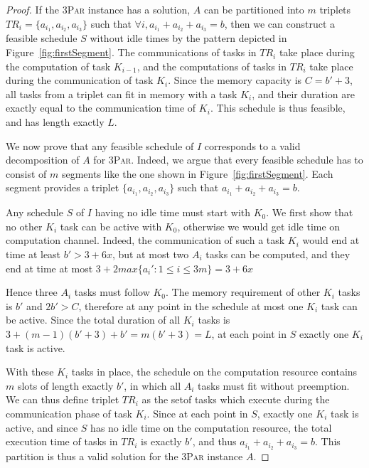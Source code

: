 \documentclass[sigconf]{acmart}
\newcommand{\threepart}{\textsc{3Par}\xspace}
\begin{document}
\begin{proof}
		
		If the \threepart instance has a solution, $A$ can be partitioned into
		$m$ triplets $TR_i = \{a_{i_1}, a_{i_2}, a_{i_3}\}$ such that $\forall
		i, a_{i_1} + a_{i_2} + a_{i_3} = b$, then we can construct a feasible
		schedule $S$ without idle times by the pattern depicted in
		Figure~\ref{fig:firstSegment}. The communications of tasks in $TR_i$ take
		place during the computation of task $K_{i-1}$, and the computations
		of tasks in $TR_i$ take place during the communication of task
		$K_i$. Since the memory capacity is $C=b'+3$, all tasks from a triplet
		can fit in memory with a task $K_i$, and their duration are exactly
		equal to the communication time of $K_i$. This schedule is thus
		feasible, and has length exactly $L$.
		
		\medskip
		
		We now prove that any feasible schedule of $I$ corresponds to a valid
		decomposition of $A$ for \threepart. Indeed, we argue that every
		feasible schedule has to consist of $m$ segments like the one shown in
		Figure~\ref{fig:firstSegment}. Each segment provides a triplet
		$\{a_{i_1}, a_{i_2}, a_{i_3}\}$ such that $a_{i_1} + a_{i_2} + a_{i_3}
		= b$.
		
		Any schedule $S$ of $I$ having no idle time must start with $K_0$. We
		first show that no other $K_i$ task can be active with $K_0$,
		otherwise we would get idle time on computation channel. Indeed, the
		communication of such a task $K_i$ would end at time at least $b'>3 +
		6x$, but at most two $A_i$ tasks can be computed, and they end at time
		at most $3+2max\{a_i':1\le i\le 3m\} = 3 + 6x$
		
		Hence three $A_i$ tasks must follow $K_0$. The memory requirement of
		other $K_i$ tasks is $b'$ and $2b'>C$, therefore at any point in the
		schedule at most one $K_i$ task can be active. Since the total
		duration of all $K_i$ tasks is $3 + (m-1)(b'+3) + b' = m (b'+3)=L$, at
		each point in $S$ exactly one $K_i$ task is active.
		
		With these $K_i$ tasks in place, the schedule on the computation
		resource contains $m$ slots of length exactly $b'$, in which all $A_i$
		tasks must fit without preemption. We can thus define triplet $TR_i$
		as the setof tasks which execute during the communication phase of
		task $K_i$. Since at each point in $S$, exactly one $K_i$ task is
		active, and since $S$ has no idle time on the computation resource,
		the total execution time of tasks in $TR_i$ is exactly $b'$, and thus
		$a_{i_1} + a_{i_2} + a_{i_3} = b$. This partition is thus a valid
		solution for the \threepart instance $A$. 
		
	\end{proof}
	
\end{document}
